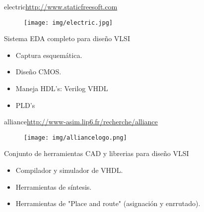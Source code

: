 \documentclass{beamer}
\begin{document}


\begin{frame}{electric}{\url{http://www.staticfreesoft.com}}
  \begin{figure}[!h]
    \centering
    \texttt{[image: img/electric.jpg]}
  \end{figure}
  Sistema EDA completo para diseño VLSI
  \begin{itemize}
  \item Captura esquemática.
  \item Diseño CMOS.
  \item Maneja HDL's: Verilog VHDL
  \item PLD's
  \end{itemize}
\end{frame}

\begin{frame}{alliance}{\url{http://www-asim.lip6.fr/recherche/alliance}}
  \begin{figure}[!h]
    \centering
    \texttt{[image: img/alliancelogo.png]}
  \end{figure}
  Conjunto de herramientas CAD y librerias para diseño VLSI
  \begin{itemize}
  \item Compilador y simulador de VHDL.
  \item Herramientas de síntesis.
  \item Herramientas de "Place and route" (asignación y enrrutado).
  \end{itemize}
\end{frame}
\end{document}
